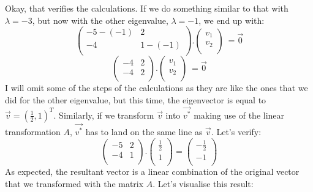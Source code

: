 \documentclass[600paper, 11pt,twoside,openany]{kdp}
\begin{document}
\indent Okay, that verifies the calculations. If we do something similar to that with $\lambda = −3$, but now with the other eigenvalue, $\lambda =−1$, we end up with:
\[\begin{pmatrix}
-5-(-1) & 2  \\
-4 & 1-(-1) \\
\end{pmatrix} .\begin{pmatrix}
 v_1\\
v_2\\
\end{pmatrix} \ = \overrightarrow{0} \]
\[\begin{pmatrix}
-4 & 2  \\
-4 & 2 \\
\end{pmatrix} .\begin{pmatrix}
 v_1\\
v_2\\
\end{pmatrix} \ = \overrightarrow{0} \]
\indent I will omit some of the steps of the calculations as they are like the ones that we did for the other eigenvalue, but this time, the eigenvector is equal to $\overrightarrow{v} = (\frac{1}{2}, 1)^T$. Similarly, if we transform $\overrightarrow{v}$ into $\overrightarrow{v^*}$ making use of the linear transformation $A$, $\overrightarrow{v^*}$ has to land on the same line as $\overrightarrow{v}$. Let’s verify:
\[\begin{pmatrix}
-5 & 2  \\
-4 & 1 \\
\end{pmatrix}.\begin{pmatrix}
\frac{1}{2} \\
1  \\
\end{pmatrix}  = \begin{pmatrix}
-\frac{1}{2}   \\
-1  \\
\end{pmatrix} \]
\indent 
As expected, the resultant vector is a linear combination of the original vector that we transformed with the matrix $A$. 
Let's visualise this result:
\end{document}
